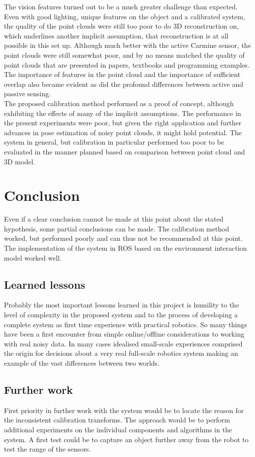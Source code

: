 The vision features turned out to be a much greater challenge than expected. Even with good lighting, unique features on the object and a calibrated system, the quality of the point clouds were still too poor to do 3D reconstruction on, which underlines another implicit assumption, that reconstruction is at all possible in this set up. Although much better with the active Carmine sensor, the point clouds were still somewhat poor, and by no means matched the quality of point clouds that are presented in papers, textbooks and programming examples. The importance of features in the point cloud and the importance of sufficient overlap also became evident as did the profound differences between active and passive sensing.\\

The proposed calibration method performed as a proof of concept, although exhibiting the effects of many of the implicit assumptions. The performance in the present experiments were poor, but given the right application and further advances in pose estimation of noisy point clouds, it might hold potential. The system in general, but calibration in particular performed too poor to be evaluated in the manner planned based on comparison between point cloud and 3D model.\\

\chapter{Conclusion}
Even if a clear conclusion cannot be made at this point about the stated hypothesis, some partial conclusions can be made. The calibration method worked, but performed poorly and can thus not be recommended at this point. The implementation of the system in ROS based on the environment interaction model worked well. \\


\section{Learned lessons}
Probably the most important lessons learned in this project is humility to the level of complexity in the proposed system and to the process of developing a complete system as first time experience with practical robotics. So many things have been a first encounter from simple online/offline considerations to working with real noisy data. In many cases idealised small-scale experiences comprised the origin for decisions about a very real full-scale robotics system making an example of the vast differences between two worlds.

\section{Further work}
First priority in further work with the system would be to locate the reason for the inconsistent calibration transforms. The approach would be to perform additional experiments on the individual components and algorithms in the system. A first test could be to capture an object further away from the robot to test the range of the sensors.